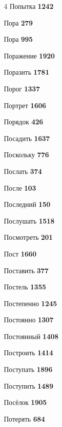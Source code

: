 \begin{multicols}{4}
\noindent Попытка \dotfill \textbf{\color{secondary} 1242}\par
\noindent Пора \dotfill \textbf{\color{secondary} 279}\par
\noindent Пора \dotfill \textbf{\color{secondary} 995}\par
\noindent Поражение \dotfill \textbf{\color{secondary} 1920}\par
\noindent Поразить \dotfill \textbf{\color{secondary} 1781}\par
\noindent Порог \dotfill \textbf{\color{secondary} 1337}\par
\noindent Портрет \dotfill \textbf{\color{secondary} 1606}\par
\noindent Порядок \dotfill \textbf{\color{secondary} 426}\par
\noindent Посадить \dotfill \textbf{\color{secondary} 1637}\par
\noindent Поскольку \dotfill \textbf{\color{secondary} 776}\par
\noindent Послать \dotfill \textbf{\color{secondary} 374}\par
\noindent После \dotfill \textbf{\color{secondary} 103}\par
\noindent Последний \dotfill \textbf{\color{secondary} 150}\par
\noindent Послушать \dotfill \textbf{\color{secondary} 1518}\par
\noindent Посмотреть \dotfill \textbf{\color{secondary} 201}\par
\noindent Пост \dotfill \textbf{\color{secondary} 1660}\par
\noindent Поставить \dotfill \textbf{\color{secondary} 377}\par
\noindent Постель \dotfill \textbf{\color{secondary} 1355}\par
\noindent Постепенно \dotfill \textbf{\color{secondary} 1245}\par
\noindent Постоянно \dotfill \textbf{\color{secondary} 1307}\par
\noindent Постоянный \dotfill \textbf{\color{secondary} 1408}\par
\noindent Построить \dotfill \textbf{\color{secondary} 1414}\par
\noindent Поступать \dotfill \textbf{\color{secondary} 1896}\par
\noindent Поступить \dotfill \textbf{\color{secondary} 1489}\par
\noindent Посёлок \dotfill \textbf{\color{secondary} 1905}\par
\noindent Потерять \dotfill \textbf{\color{secondary} 684}\par

\end{multicols}
